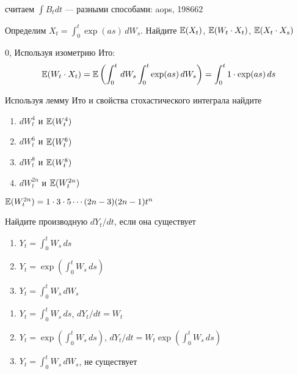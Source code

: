 \begin{problem}
считаем $\int B_{t}dt$ --- разными способами: aops, 198662 
\end{problem} 
\begin{solution} 

\end{solution}

\begin{problem}
 Определим $X_t=\int_0^t \exp(as)\,dW_s$. Найдите $\mathbb{E}(X_t)$, $\mathbb{E}(W_t\cdot X_t)$, $\mathbb{E}(X_t\cdot X_s)$ 
\end{problem} 
\begin{solution} 
 $0$, Используя изометрию Ито:
\begin{equation}
\mathbb{E}(W_t\cdot X_t)=\mathbb{E}\left(\int_0^t\,dW_s \int_0^t\exp(as)\,dW_s\right)=\int_0^t 1\cdot \exp(as)\,ds
\end{equation}
\end{solution}

\begin{problem}
Используя лемму Ито и свойства стохастического интеграла найдите 
\begin{enumerate}
\item $dW^4_t$ и $\mathbb{E}(W^4_t)$
\item $dW^6_t$ и $\mathbb{E}(W^6_t)$
\item $dW^8_t$ и $\mathbb{E}(W^8_t)$
\item $dW^{2n}_t$ и $\mathbb{E}(W^{2n}_t)$
\end{enumerate} 
\end{problem} 
\begin{solution} 
 $\mathbb{E}(W^{2n}_t)=1\cdot 3\cdot 5 \cdots (2n-3)(2n-1)t^n$ 
\end{solution}

\begin{problem}
Найдите производную $dY_t/dt$, если она существует
\begin{enumerate}
\item $Y_t=\int_0^t W_s \, ds$
\item $Y_t=\exp (\int_0^t W_s \, ds)$
\item $Y_t=\int_0^t W_s \, dW_s$
\end{enumerate}
\end{problem}

\begin{solution}
\begin{enumerate}
\item $Y_t=\int_0^t W_s \, ds$, $dY_t/dt=W_t$
\item $Y_t=\exp (\int_0^t W_s \, ds)$, $dY_t/dt=W_t\exp (\int_0^t W_s \, ds)$
\item $Y_t=\int_0^t W_s \, dW_s$, не существует
\end{enumerate}
\end{solution}

